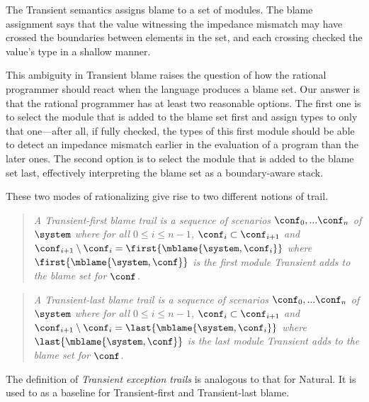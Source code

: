 
The Transient semantics assigns blame to a set of modules. The blame
assignment says that the value witnessing the impedance mismatch may have
crossed the boundaries between elements in the set, and each crossing
checked the value's type in a shallow manner.

This ambiguity in Transient blame raises the question of how the rational
programmer should react when the language produces a blame set. Our answer
is that the rational programmer has at least two reasonable options. The first
one is to select the module that is added to the blame set first and
assign types to only that one---after all, if fully checked, the types of this
first module should be able to detect an impedance mismatch earlier in the
evaluation of a program than the later ones. The second option is to select the
module that is added to the blame set last, effectively interpreting the
blame set as a boundary-aware stack.

These two modes of rationalizing give rise to two different notions of trail.

\begin{quote}
\it A \emph{Transient-first blame trail} is a sequence of scenarios
$\conf_0,...\conf_n$ of $\system$ where for all $0 \leq i \leq n - 1$,
$\conf_i \subset \conf_{i+1}$ and $\conf_{i+1} \setminus \conf_i =
\first{\mblame{\system, \conf_i}}$ where $\first{\mblame{\system, \conf}}$ is the
first module Transient adds to the blame set for $\conf$.
\end{quote}

\begin{quote}
\it A \emph{Transient-last blame trail} is a sequence of scenarios
$\conf_0,...\conf_n$ of $\system$ where for all $0 \leq i \leq n - 1$,
$\conf_i \subset \conf_{i+1}$ and $\conf_{i+1} \setminus \conf_i =
  \last{\mblame{\system, \conf_i}}$ where $\last{\mblame{\system, \conf}}$ is the
last module Transient adds to the blame set for $\conf$.
\end{quote}

The definition of \emph{Transient exception trails} is analogous to that for
Natural. It is used to as a baseline for Transient-first and Transient-last
blame.
